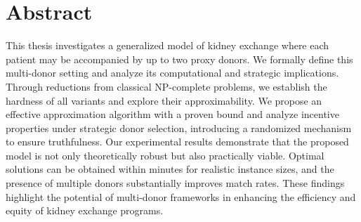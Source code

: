 \begingroup
\let\clearpage\relax
\let\cleardoublepage\relax
\let\cleardoublepage\relax

\chapter*{Abstract}
This thesis investigates a generalized model of kidney exchange where each patient may be accompanied by up to two proxy donors. We formally define this multi-donor setting and analyze its computational and strategic implications. Through reductions from classical NP-complete problems, we establish the hardness of all variants and explore their approximability. We propose an effective approximation algorithm with a proven bound and analyze incentive properties under strategic donor selection, introducing a randomized mechanism to ensure truthfulness. Our experimental results demonstrate that the proposed model is not only theoretically robust but also practically viable. Optimal solutions can be obtained within minutes for realistic instance sizes, and the presence of multiple donors substantially improves match rates. These findings highlight the potential of multi-donor frameworks in enhancing the efficiency and equity of kidney exchange programs.


\vfill

\endgroup			

\vfill
